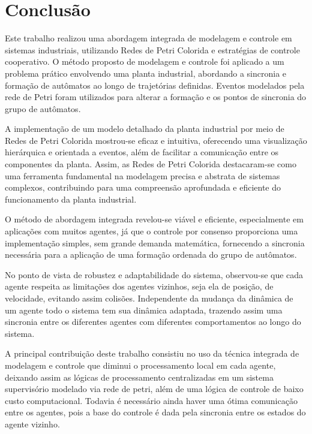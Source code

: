\chapter{Conclusão}
\label{chap:conclusion}
Este trabalho realizou uma abordagem integrada de modelagem e controle em sistemas industriais, utilizando Redes de Petri Colorida e estratégias de controle cooperativo. 
O método proposto de modelagem e controle foi aplicado a um problema prático envolvendo uma planta industrial, abordando a sincronia e formação de autômatos ao longo de trajetórias definidas. Eventos modelados pela rede de Petri foram utilizados para alterar a formação e os pontos de sincronia do grupo de autômatos. 

A implementação de um modelo detalhado da planta industrial por meio de Redes de Petri Colorida mostrou-se eficaz e intuitiva, oferecendo uma visualização hierárquica e orientada a eventos, além de facilitar a comunicação entre os componentes da planta. Assim, as Redes de Petri Colorida destacaram-se como uma ferramenta fundamental na modelagem precisa e abstrata de sistemas complexos, contribuindo para uma compreensão aprofundada e eficiente do funcionamento da planta industrial. 

O método de abordagem integrada revelou-se viável e eficiente, especialmente em aplicações com muitos agentes, já que o controle por consenso proporciona uma implementação simples, sem grande demanda matemática, fornecendo a sincronia necessária para a aplicação de uma formação ordenada do grupo de autômatos. 

No ponto de vista de robustez e adaptabilidade do sistema, observou-se que cada agente respeita as limitações dos agentes vizinhos, seja ela de posição, de velocidade, evitando assim colisões. Independente da mudança da dinâmica de um agente todo o sistema tem sua dinâmica adaptada, trazendo assim uma sincronia entre os diferentes agentes com diferentes comportamentos ao longo do sistema.

A principal contribuição  deste trabalho consistiu no uso da técnica integrada de modelagem e controle que diminui o processamento local em cada agente, deixando assim as lógicas de processamento centralizadas em um sistema supervisório modelado via rede de petri, além de uma lógica de controle de baixo custo computacional. Todavia é necessário ainda haver uma ótima comunicação entre os agentes, pois a base do controle é dada pela sincronia entre os estados do agente vizinho.
